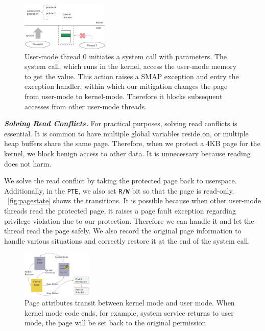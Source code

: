 \begin{figure}[th]
  \includegraphics[width=0.37\textwidth]{figures/denyuserwrite}
  \centering
  \caption{User-mode thread 0 initiates a system call with parameters. The system call, which runs in the kernel, access the user-mode memory to get the value. This action raises a SMAP exception and entry the exception handler, within which our mitigation changes the page from user-mode to kernel-mode. Therefore it blocks subsequent accesses from other user-mode threads.}
  \label{fig:denyuserwrite}
\end{figure}




\textbf{\textit{Solving Read Conflicts.}} For practical purposes, solving read conflicts is essential. It is common to have multiple global variables reside on, or multiple heap buffers share the same page. Therefore, when we protect a 4KB page for the kernel, we block benign access to other data.  It is unnecessary because reading does not harm.  

We solve the read conflict by taking the protected page back to userspace. Additionally, in the \texttt{PTE}, we also set \texttt{R/W} bit so that the page is read-only. ~\autoref{fig:pagestate} shows the transitions. It is possible because when other user-mode threads read the protected page, it raises a page fault exception regarding privilege violation due to our protection. Therefore we can handle it and let the thread read the page safely. We also record the original page information to handle various situations and correctly restore it at the end of the system call. 

\begin{figure}[th]
  \includegraphics[width=0.30\textwidth]{figures/pagestate}
  \centering
  \caption{Page attributes transit between kernel mode and user mode. When kernel mode code ends, for example, system service returns to user mode, the page will be set back to the original permission}
  \label{fig:pagestate}
\end{figure}




